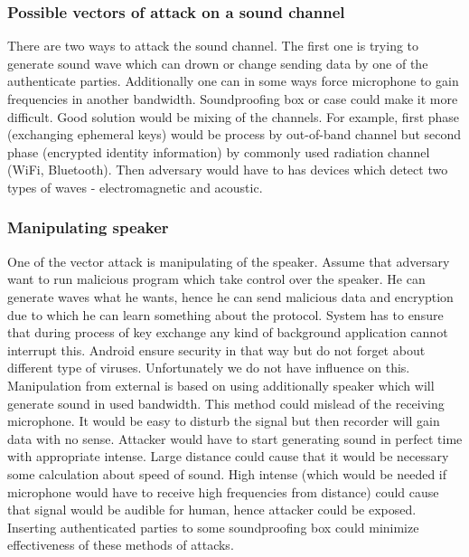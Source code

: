 \documentclass[11pt,titlepage]{article}
\theoremstyle{plain}
\begin{document}
\subsubsection{Possible vectors of attack on a sound channel}
There are two ways to attack the sound channel. The first one is trying to generate sound wave which can drown or change sending data by one of the authenticate parties. Additionally one can in some ways force microphone to gain frequencies in another bandwidth. Soundproofing box or case could make it more difficult. %
Good solution would be mixing of the channels. For example, first phase (exchanging ephemeral keys) would be process by out-of-band channel but second phase (encrypted identity information) by commonly used radiation channel (WiFi, Bluetooth). Then adversary would have to has devices which detect two types of waves - electromagnetic and acoustic.

\subsubsection{Manipulating speaker}
One of the vector attack is manipulating of the speaker. Assume that adversary want to run malicious program which take control over the speaker. He can generate waves what he wants, hence he can send malicious data and encryption due to which he can learn something about the protocol. System has to ensure that during process of key exchange any kind of background application cannot interrupt this. Android ensure security in that way but do not forget about different type of viruses. Unfortunately we do not have influence on this. Manipulation from external is based on using additionally speaker which will generate sound in used bandwidth. This method could mislead of the receiving microphone. It would be easy to disturb the signal but then recorder will gain data with no sense. Attacker would have to start generating sound in perfect time with appropriate intense. Large distance could cause that it would be necessary some calculation about speed of sound. High intense (which would be needed if microphone would have to receive high frequencies from distance) could cause that signal would be audible for human, hence attacker could be exposed. Inserting authenticated parties to some soundproofing box could minimize effectiveness of these methods of attacks.
\end{document}
